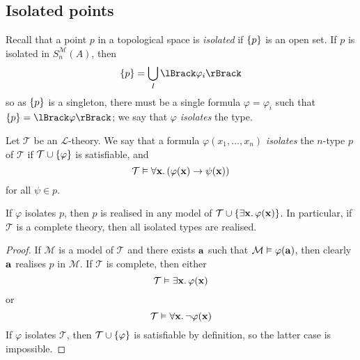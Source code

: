 \subsection{Isolated points}
Recall that a point \( p \) in a topological space is \emph{isolated} if \( \qty{p} \) is an open set.
If \( p \) is isolated in \( S_n^{\mathcal M}(A) \), then
\[ \qty{p} = \bigcup_I \lBrack\varphi_i\rBrack \]
so as \( \qty{p} \) is a singleton, there must be a single formula \( \varphi = \varphi_i \) such that \( \qty{p} = \lBrack\varphi\rBrack \); we say that \( \varphi \) \emph{isolates} the type.
\begin{definition}
    Let \( \mathcal T \) be an \( \mathcal L \)-theory.
    We say that a formula \( \varphi(x_1, \dots, x_n) \) \emph{isolates} the \( n \)-type \( p \) of \( \mathcal T \) if \( \mathcal T \cup \qty{\varphi} \) is satisfiable, and
    \[ \mathcal T \vDash \forall \vb x.\, (\varphi(\vb x) \to \psi(\vb x)) \]
    for all \( \psi \in p \).
\end{definition}
\begin{proposition}
    If \( \varphi \) isolates \( p \), then \( p \) is realised in any model of \( \mathcal T \cup \qty{\exists \vb x.\, \varphi(\vb x)} \).
    In particular, if \( \mathcal T \) is a complete theory, then all isolated types are realised.
\end{proposition}
\begin{proof}
    If \( \mathcal M \) is a model of \( \mathcal T \) and there exists \( \vb a \) such that \( \mathcal M \vDash \varphi(\vb a) \), then clearly \( \vb a \) realises \( p \) in \( \mathcal M \).
    If \( \mathcal T \) is complete, then either
    \[ \mathcal T \vDash \exists \vb x.\, \varphi(\vb x) \]
    or
    \[ \mathcal T \vDash \forall \vb x.\, \neg \varphi(\vb x) \]
    If \( \varphi \) isolates \( \mathcal T \), then \( \mathcal T \cup \qty{\varphi} \) is satisfiable by definition, so the latter case is impossible.
\end{proof}

